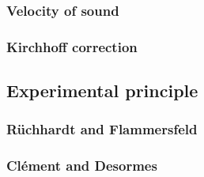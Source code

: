 \documentclass{subfiles}
\begin{document}
        \subsubsection*{Velocity of sound}

        \subsubsection*{Kirchhoff correction}

        \subsection{Experimental principle}

        \subsubsection*{Rüchhardt and Flammersfeld}

        \subsubsection*{Clément and Desormes}


\end{document}
